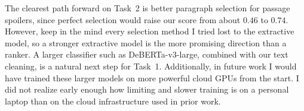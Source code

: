 \documentclass[11pt]{article}
\begin{document}
The clearest path forward on Task~2 is better paragraph selection for passage
spoilers, since perfect selection would raise our score from about $0.46$ to
$0.74$. However, keep in the mind every selection method I tried lost to the extractive model, so
a stronger extractive model is the more promising direction than a
ranker. A larger classifier such as DeBERTa-v3-large, combined with our text
cleaning, is a natural next step for Task~1. Additionally, in future work I would have trained
these larger models on more powerful cloud GPUs from the start. I did not realize early enough how limiting and slower training is on a personal laptop than on the cloud infrastructure used in prior work.



\end{document}
